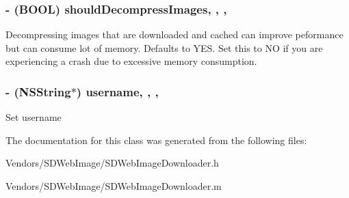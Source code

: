 \subsubsection[{should\+Decompress\+Images}]{\setlength{\rightskip}{0pt plus 5cm}-\/ (B\+O\+O\+L) should\+Decompress\+Images\hspace{0.3cm}{\ttfamily [read]}, {\ttfamily [write]}, {\ttfamily [nonatomic]}, {\ttfamily [assign]}}\label{interface_s_d_web_image_downloader_ac91a3f91279023164c48bd066abbfbea}
Decompressing images that are downloaded and cached can improve peformance but can consume lot of memory. Defaults to Y\+E\+S. Set this to N\+O if you are experiencing a crash due to excessive memory consumption. \hypertarget{interface_s_d_web_image_downloader_adec754b62354b9c84a190cd954a52aaa}{}
\subsubsection[{username}]{\setlength{\rightskip}{0pt plus 5cm}-\/ (N\+S\+String$\ast$) username\hspace{0.3cm}{\ttfamily [read]}, {\ttfamily [write]}, {\ttfamily [nonatomic]}, {\ttfamily [strong]}}\label{interface_s_d_web_image_downloader_adec754b62354b9c84a190cd954a52aaa}
Set username 

The documentation for this class was generated from the following files\+:\begin{DoxyCompactItemize}
\item 
Vendors/\+S\+D\+Web\+Image/S\+D\+Web\+Image\+Downloader.\+h\item 
Vendors/\+S\+D\+Web\+Image/S\+D\+Web\+Image\+Downloader.\+m\end{DoxyCompactItemize}
